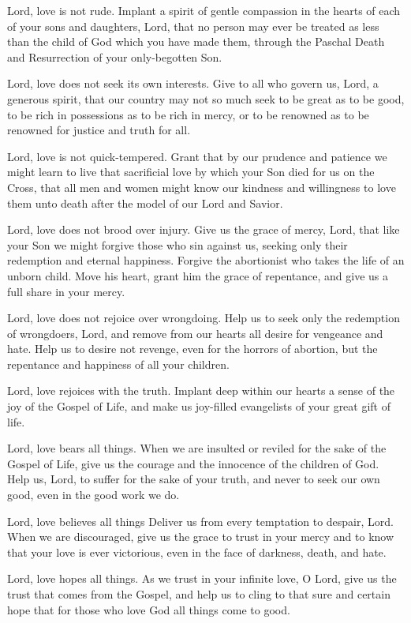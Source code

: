 \documentclass[12pt]{article}
\begin{document}
Lord, love is not rude.
Implant a spirit of gentle compassion in the hearts of each of your sons and daughters, Lord, that no person may ever be treated as less than the child of God which you have made them, through the Paschal Death and Resurrection of your only-begotten Son.

Lord, love does not seek its own interests.
Give to all who govern us, Lord, a generous spirit, that our country may not so much seek to be great as to be good, to be rich in possessions as to be rich in mercy, or to be renowned as to be renowned for justice and truth for all.

Lord, love is not quick-tempered.
Grant that by our prudence and patience we might learn to live that sacrificial love by which your Son died for us on the Cross, that all men and women might know our kindness and willingness to love them unto death after the model of our Lord and Savior.

Lord, love does not brood over injury.
Give us the grace of mercy, Lord, that like your Son we might forgive those who sin against us, seeking only their redemption and eternal happiness.
Forgive the abortionist who takes the life of an unborn child. Move his heart, grant him the grace of repentance, and give us a full share in your mercy.

Lord, love does not rejoice over wrongdoing.
Help us to seek only the redemption of wrongdoers, Lord, and remove from our hearts all desire for vengeance and hate.
Help us to desire not revenge, even for the horrors of abortion, but the repentance and happiness of all your children.

Lord, love rejoices with the truth.
Implant deep within our hearts a sense of the joy of the Gospel of Life, and make us joy-filled evangelists of your great gift of life.

Lord, love bears all things.
When we are insulted or reviled for the sake of the Gospel of Life, give us the courage and the innocence of the children of God.
Help us, Lord, to suffer for the sake of your truth, and never to seek our own good, even in the good work we do.

Lord, love believes all things
Deliver us from every temptation to despair, Lord. When we are discouraged, give us the grace to trust in your mercy and to know that your love is ever victorious, even in the face of darkness, death, and hate.

Lord, love hopes all things.
As we trust in your infinite love, O Lord, give us the trust that comes from the Gospel, and help us to cling to that sure and certain hope that for those who love God all things come to good.
\end{document}
